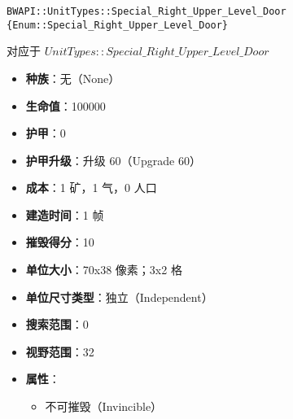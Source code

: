 \begin{tcolorbox}[colback=white, colframe=black!60!white, title=Special\_Right\_Upper\_Level\_Door(), arc=0mm]
    \begin{verbatim}
BWAPI::UnitTypes::Special_Right_Upper_Level_Door {Enum::Special_Right_Upper_Level_Door}
    \end{verbatim}
    对应于  $UnitTypes::Special\_Right\_Upper\_Level\_Door$ 
    \begin{itemize}
        \item \textbf{种族}：无（None）
        \item \textbf{生命值}：100000
        \item \textbf{护甲}：0
        \item \textbf{护甲升级}：升级 60（Upgrade 60）
        \item \textbf{成本}：1 矿，1 气，0 人口
        \item \textbf{建造时间}：1 帧
        \item \textbf{摧毁得分}：10
        \item \textbf{单位大小}：70x38 像素；3x2 格
        \item \textbf{单位尺寸类型}：独立（Independent）
        \item \textbf{搜索范围}：0
        \item \textbf{视野范围}：32
        \item \textbf{属性}：
            \begin{itemize}
                \item 不可摧毁（Invincible）
            \end{itemize}
    \end{itemize}
\end{tcolorbox}


